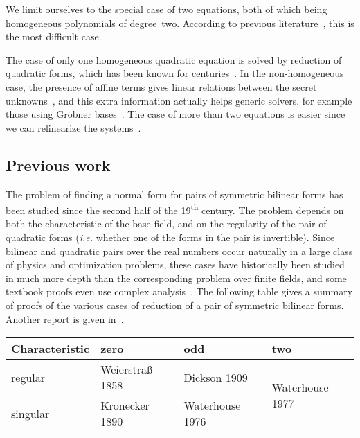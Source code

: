 \documentclass{lms}
\begin{document}
We limit ourselves to the special case of two equations, both of which
being homogeneous polynomials of degree~two. According to previous
literature~\cite{DBLP:conf/eurocrypt/Perret05,DBLP:conf/eurocrypt/FaugereP06,DBLP:conf/pkc/BouillaguetFFP11,DBLP:conf/eurocrypt/BouillaguetFV13},
this is the most difficult case.

The case of only one homogeneous quadratic equation
is solved by reduction of quadratic forms,
which has been known for centuries~\cite{gauss,lidl1997finite}.
In the non-homogeneous case, the presence of affine terms
gives linear relations between
the secret unknowns~\cite{DBLP:conf/eurocrypt/PatarinGC98},
and this extra information actually helps generic solvers,
for example those using Gröbner bases~\cite{DBLP:conf/eurocrypt/FaugereP06}.
The case of more than two equations is easier since we can relinearize
the systems~\cite{DBLP:conf/pkc/BouillaguetFFP11}.

\subsection*{Previous work}

The problem of finding a normal form for pairs of symmetric bilinear forms
has been studied since the second half of the 19\textsuperscript{th} century.
The problem depends on both the characteristic of the base field,
and on the regularity of the pair of quadratic forms
(\emph{i.e.} whether one of the forms in the pair is invertible).
Since bilinear and quadratic pairs over the real numbers occur naturally
in a large class of physics and optimization problems,
these cases have historically been studied in much more depth
than the corresponding problem over finite fields,
and some textbook proofs even use complex analysis~\cite[XII(56)]{Gantmacher}.
The following table gives a summary of proofs of the various cases
of reduction of a pair of symmetric bilinear forms.
Another report is given in~\cite{olomouc2004fv}.

\medskip
\hfil\begin{tabular}{l|lll}
Characteristic & zero & odd & two \\
\toprule
regular & Weierstraß 1858\cite{1858weierstrass}
  & Dickson 1909\cite{ams1909dickson}
  & \multirow{2}{*}{Waterhouse 1977\cite{pacific1977waterhouse}} \\
singular & Kronecker 1890\cite{1890kronecker}
  & Waterhouse 1976\cite{inventiones1976waterhouse} & \\
\bottomrule
\end{tabular}
\medskip
\end{document}
